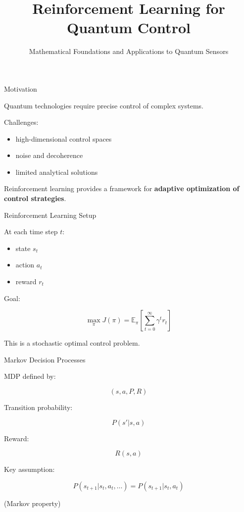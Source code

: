 \documentclass{beamer}
\title{Reinforcement Learning for Quantum Control}
\subtitle{Mathematical Foundations and Applications to Quantum Sensors}
\author{}
\date{}
\begin{document}
\frame{\titlepage}

\begin{frame}{Motivation}

Quantum technologies require precise control of complex systems.

Challenges:

\begin{itemize}
\item high-dimensional control spaces
\item noise and decoherence
\item limited analytical solutions
\end{itemize}

Reinforcement learning provides a framework for
\textbf{adaptive optimization of control strategies}.

\end{frame}

\begin{frame}{Reinforcement Learning Setup}

At each time step $t$:

\begin{itemize}
\item state $s_t$
\item action $a_t$
\item reward $r_t$
\end{itemize}

Goal:

\[
\max_{\pi} J(\pi) =
\mathbb{E}_\pi \left[\sum_{t=0}^\infty \gamma^t r_t \right]
\]

This is a stochastic optimal control problem.

\end{frame}

\begin{frame}{Markov Decision Processes}

  MDP defined by:

  \[
  (s,a,P,R)
  \]

  Transition probability:

  \[
  P(s'|s,a)
  \]

  Reward:

  \[
  R(s,a)
  \]

  Key assumption:

  \[
  P(s_{t+1}|s_t,a_t,\dots) = P(s_{t+1}|s_t,a_t)
  \]

  (Markov property)

\end{frame}
\end{document}
